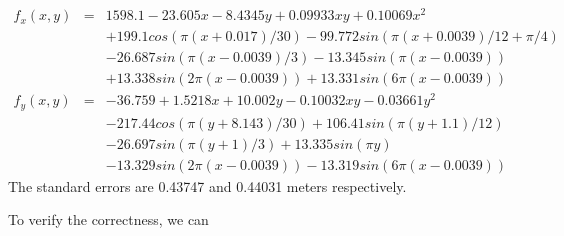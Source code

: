 \documentclass[a4paper]{article}
\begin{document}
\begin{eqnarray}
f_x(x,y) &=& 1598.1-23.605x -8.4345y +0.09933xy +0.10069x^2 \nonumber \\
          & & +199.1cos(\pi(x+0.017)/30) -99.772sin(\pi(x+0.0039)/12+\pi/4) \nonumber \\
          & & -26.687sin(\pi(x-0.0039)/3) -13.345sin(\pi(x-0.0039)) \nonumber \\
          & & +13.338sin(2\pi(x-0.0039)) +13.331sin(6\pi(x-0.0039)) \\
f_y(x,y) &=& -36.759 +1.5218x +10.002y -0.10032xy -0.03661y^2 \nonumber \\
         & & -217.44cos(\pi(y+8.143)/30)+106.41sin(\pi(y+1.1)/12) \nonumber \\
         & & -26.697sin(\pi(y+1)/3) +13.335sin(\pi y) \nonumber \\
         & & -13.329sin(2\pi(x-0.0039)) -13.319sin(6\pi(x-0.0039))
\end{eqnarray}
The standard errors are 0.43747 and 0.44031 meters respectively.

To verify the correctness, we can 
\end{document}
